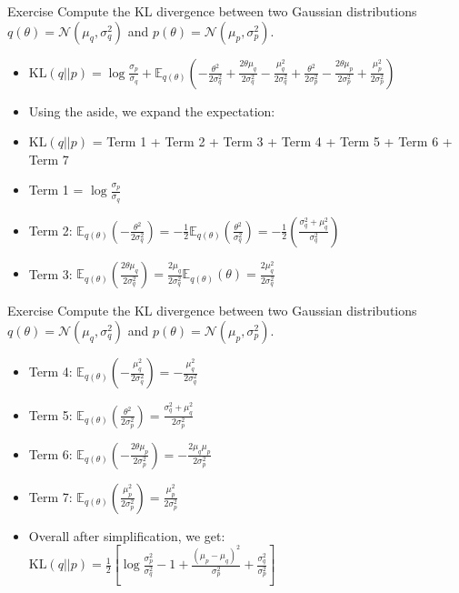 \documentclass{beamer}
\begin{document}
\begin{frame}{Exercise}
    Compute the KL divergence between two Gaussian distributions $q(\theta) = \mathcal{N}(\mu_q, \sigma_q^2)$ and $p(\theta) = \mathcal{N}(\mu_p, \sigma_p^2)$.
    \begin{itemize}
        \item \pause $\text{KL}(q||p) = \log \frac{\sigma_p}{\sigma_q} + \mathbb{E}_{q(\theta)} (-\frac{\theta^2}{2\sigma_q^2} + \frac{2\theta\mu_q}{2\sigma_q^2} - \frac{\mu_q^2}{2\sigma_q^2} + \frac{\theta^2}{2\sigma_p^2} - \frac{2\theta\mu_p}{2\sigma_p^2} + \frac{\mu_p^2}{2\sigma_p^2})$
        \item \pause Using the aside, we expand the expectation:
        \item \pause $\text{KL}(q||p)$ = Term 1 + Term 2 + Term 3 + Term 4 + Term 5 + Term 6 + Term 7
        \item \pause Term 1 = $\log \frac{\sigma_p}{\sigma_q}$
        \item \pause Term 2: $\mathbb{E}_{q(\theta)} \left(-\frac{\theta^2}{2\sigma_q^2}\right) = -\frac{1}{2}\mathbb{E}_{q(\theta)} \left(\frac{\theta^2}{\sigma_q^2}\right) = -\frac{1}{2}\left(\frac{\sigma_q^2 + \mu_q^2}{\sigma_q^2}\right)$
        \item \pause Term 3: $\mathbb{E}_{q(\theta)} \left(\frac{2\theta\mu_q}{2\sigma_q^2}\right) = \frac{2\mu_q}{2\sigma_q^2}\mathbb{E}_{q(\theta)} \left(\theta\right) = \frac{2\mu_q^2}{2\sigma_q^2}$
    \end{itemize}
    
    
\end{frame}

\begin{frame}{Exercise}
    Compute the KL divergence between two Gaussian distributions $q(\theta) = \mathcal{N}(\mu_q, \sigma_q^2)$ and $p(\theta) = \mathcal{N}(\mu_p, \sigma_p^2)$.
    \begin{itemize}
        \item Term 4: $\mathbb{E}_{q(\theta)} \left(-\frac{\mu_q^2}{2\sigma_q^2}\right) = -\frac{\mu_q^2}{2\sigma_q^2}$
       \item \pause Term 5: $\mathbb{E}_{q(\theta)} \left(\frac{\theta^2}{2\sigma_p^2}\right) = \frac{\sigma_q^2 + \mu_q^2}{2\sigma_p^2}$
    \item \pause Term 6: $\mathbb{E}_{q(\theta)} \left(-\frac{2\theta\mu_p}{2\sigma_p^2}\right) = -\frac{2\mu_q\mu_p}{2\sigma_p^2}$
\item \pause Term 7: $\mathbb{E}_{q(\theta)} \left(\frac{\mu_p^2}{2\sigma_p^2}\right) = \frac{\mu_p^2}{2\sigma_p^2}$    
\item \pause Overall after simplification, we get:
$\text{KL}(q||p) = \frac{1}{2}[ \log \frac{\sigma_p^2}{\sigma_q^2} -1 + \frac{(\mu_p - \mu_q)^2}{\sigma_p^2} + \frac{\sigma_q^2}{\sigma_p^2}]$   

\end{itemize}
    

  
    
\end{frame}
\end{document}
